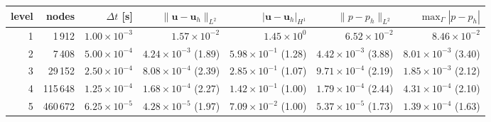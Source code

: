 \begin{tabular}{rrrrrrr}
\toprule
level & nodes & $\Delta t$ [s] & $\|\mathbf{u}-\mathbf{u}_h\|_{L^2}$ & $|\mathbf{u}-\mathbf{u}_h|_{H^1}$ & $\|p-p_h\|_{L^2}$ & $\max_\Gamma|p-p_h|$ \\
\midrule
1 & 1\,912 & $1.00\times10^{-3}$ & $1.57\times10^{-2}$ & $1.45\times10^{0}$ & $6.52\times10^{-2}$ & $8.46\times10^{-2}$ \\
2 & 7\,408 & $5.00\times10^{-4}$ & $4.24\times10^{-3}$ (1.89) & $5.98\times10^{-1}$ (1.28) & $4.42\times10^{-3}$ (3.88) & $8.01\times10^{-3}$ (3.40) \\
3 & 29\,152 & $2.50\times10^{-4}$ & $8.08\times10^{-4}$ (2.39) & $2.85\times10^{-1}$ (1.07) & $9.71\times10^{-4}$ (2.19) & $1.85\times10^{-3}$ (2.12) \\
4 & 115\,648 & $1.25\times10^{-4}$ & $1.68\times10^{-4}$ (2.27) & $1.42\times10^{-1}$ (1.00) & $1.79\times10^{-4}$ (2.44) & $4.31\times10^{-4}$ (2.10) \\
5 & 460\,672 & $6.25\times10^{-5}$ & $4.28\times10^{-5}$ (1.97) & $7.09\times10^{-2}$ (1.00) & $5.37\times10^{-5}$ (1.73) & $1.39\times10^{-4}$ (1.63) \\
\bottomrule
\end{tabular}
